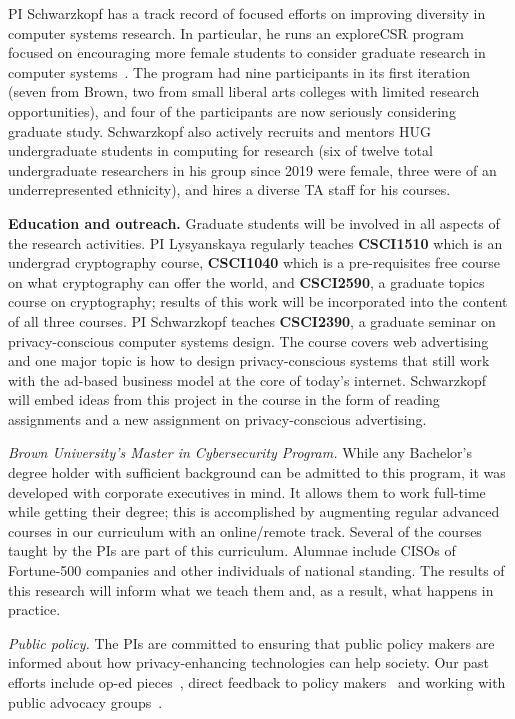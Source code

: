 PI Schwarzkopf has a track record of focused efforts on improving diversity in computer systems research. In particular, he runs an exploreCSR program focused on encouraging more female students to consider graduate research in computer systems~\cite{explorecsr-systems}. The program had nine participants in its first iteration (seven from Brown, two from small liberal arts colleges with limited research opportunities), and four of the participants are now seriously considering graduate study. Schwarzkopf also actively recruits and mentors HUG undergraduate students in computing for research (six of twelve total undergraduate researchers in his group since 2019 were female, three were of an underrepresented ethnicity), and hires a diverse TA staff for his courses.

\noindent\textbf{Education and outreach.} Graduate students will be involved in all aspects of the research activities.  PI Lysyanskaya
regularly teaches \textbf{CSCI1510} which is an undergrad cryptography course, \textbf{CSCI1040} which is a pre-requisites free course on what cryptography can offer the world, and \textbf{CSCI2590}, a graduate topics course on cryptography; results of this work will be incorporated into the content of all three courses.
%
PI Schwarzkopf teaches \textbf{CSCI2390}, a graduate seminar on privacy-conscious computer systems design. The course covers web advertising and one major topic is how to design privacy-conscious systems that still work with the ad-based business model at the core of today's internet. Schwarzkopf will embed ideas from this project in the course in the form of reading assignments and a new assignment on privacy-conscious advertising.
%

\noindent\textit{Brown University's Master in Cybersecurity Program.} While any Bachelor's degree holder with sufficient background can be admitted to this program, it was 
developed with corporate executives in mind. It allows them to work full-time while getting their degree; this is accomplished by augmenting regular advanced courses in our curriculum with an online/remote track.  Several of the courses taught by the PIs are part of this curriculum.  Alumnae include CISOs of Fortune-500 companies and other individuals of national standing.  
The results of this research will inform what we teach them and, as a result, what happens in practice.

\noindent\textit{Public policy.} The PIs are committed to ensuring that public policy makers are informed about how privacy-enhancing technologies can help society.  Our past efforts include op-ed pieces~\cite{projo1,csm,projo2}, direct feedback to policy makers~\cite{annacdt} and working with public advocacy groups~\cite{epic15}.  

